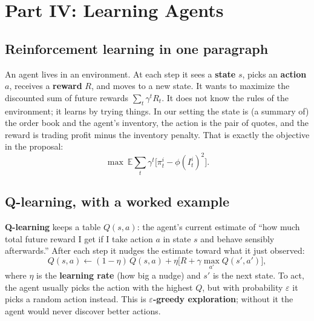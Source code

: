 \documentclass[11pt]{article}
\newcommand{\E}{\mathbb{E}}
\begin{document}
\section{Part IV: Learning Agents}

\subsection{Reinforcement learning in one paragraph}
An agent lives in an environment. At each step it sees a \textbf{state} $s$, picks an \textbf{action} $a$, receives a \textbf{reward} $R$, and moves to a new state. It wants to maximize the discounted sum of future rewards $\sum_t\gamma^t R_t$. It does not know the rules of the environment; it learns by trying things. In our setting the state is (a summary of) the order book and the agent's inventory, the action is the pair of quotes, and the reward is trading profit minus the inventory penalty. That is exactly the objective in the proposal:
\[
\max\ \E\sum_t\gamma^t\big[\pi^i_t-\phi (I^i_t)^2\big].
\]

\subsection{Q-learning, with a worked example}
\textbf{Q-learning} keeps a table $Q(s,a)$: the agent's current estimate of ``how much total future reward I get if I take action $a$ in state $s$ and behave sensibly afterwards.'' After each step it nudges the estimate toward what it just observed:
\[
Q(s,a)\leftarrow(1-\eta)\,Q(s,a)+\eta\Big[R+\gamma\max_{a'}Q(s',a')\Big],
\]
where $\eta$ is the \textbf{learning rate} (how big a nudge) and $s'$ is the next state. To act, the agent usually picks the action with the highest $Q$, but with probability $\varepsilon$ it picks a random action instead. This is \textbf{$\varepsilon$-greedy exploration}; without it the agent would never discover better actions.
\end{document}
